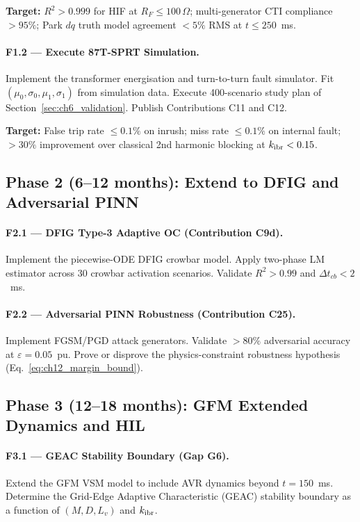\textbf{Target:} $R^2 > 0.999$ for HIF at $R_F \leq 100\,\Omega$;
multi-generator CTI compliance $> 95\%$;
Park $dq$ truth model agreement $< 5\%$ RMS at $t \leq 250$~ms.

\paragraph{F1.2 --- Execute 87T-SPRT Simulation.}
Implement the transformer energisation and turn-to-turn fault simulator.
Fit $(\mu_0, \sigma_0, \mu_1, \sigma_1)$ from simulation data.
Execute 400-scenario study plan of Section~\ref{sec:ch6_validation}.
Publish Contributions C11 and C12.

\textbf{Target:} False trip rate $\leq 0.1\%$ on inrush;
miss rate $\leq 0.1\%$ on internal fault;
$> 30\%$ improvement over classical 2nd harmonic blocking at $k_\mathrm{ibr} < 0.15$.

\subsection{Phase 2 (6--12 months): Extend to DFIG and Adversarial PINN}

\paragraph{F2.1 --- DFIG Type-3 Adaptive OC (Contribution C9d).}
Implement the piecewise-ODE DFIG crowbar model.
Apply two-phase LM estimator across 30 crowbar activation scenarios.
Validate $R^2 > 0.99$ and $\Delta t_{cb} < 2$~ms.

\paragraph{F2.2 --- Adversarial PINN Robustness (Contribution C25).}
Implement FGSM/PGD attack generators.
Validate $> 80\%$ adversarial accuracy at $\varepsilon = 0.05$~pu.
Prove or disprove the physics-constraint robustness hypothesis
(Eq.~\eqref{eq:ch12_margin_bound}).

\subsection{Phase 3 (12--18 months): GFM Extended Dynamics and HIL}

\paragraph{F3.1 --- GEAC Stability Boundary (Gap G6).}
Extend the GFM VSM model to include AVR dynamics beyond $t = 150$~ms.
Determine the Grid-Edge Adaptive Characteristic (GEAC) stability
boundary as a function of $(M, D, L_v)$ and $k_\mathrm{ibr}$.

